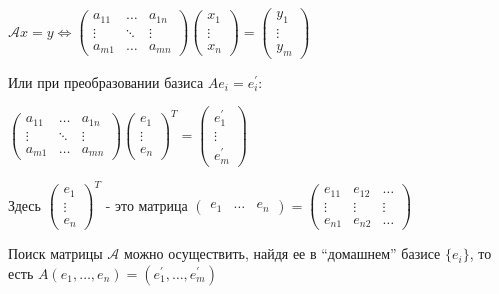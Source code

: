 \documentclass[12pt]{article}
\begin{document}
    $\mathcal{A}x = y \Longleftrightarrow \begin{pmatrix}
         a_{11} & \dots & a_{1n} \\
         \vdots & \ddots & \vdots \\
         a_{m1} & \dots & a_{mn}
    \end{pmatrix} \begin{pmatrix}
         x_1 \\
         \vdots \\
         x_n
    \end{pmatrix} = \begin{pmatrix}
         y_1 \\
         \vdots \\
         y_m
    \end{pmatrix}$

    Или при преобразовании базиса $Ae_i = e^\prime_i$:

    $\begin{pmatrix}
         a_{11} & \dots & a_{1n} \\
         \vdots & \ddots & \vdots \\
         a_{m1} & \dots & a_{mn}
    \end{pmatrix} \begin{pmatrix}
         e_1 \\
         \vdots \\
         e_n
    \end{pmatrix}^T = \begin{pmatrix}
         e_1^\prime \\
         \vdots \\
         e_m^\prime
    \end{pmatrix}$

    Здесь $\begin{pmatrix}
         e_1 \\
         \vdots \\
         e_n
    \end{pmatrix}^T$ - это матрица $\begin{pmatrix}
         e_1 & \dots & e_n
    \end{pmatrix} = \begin{pmatrix}
         e_{11} & e_{12} & \dots \\
         \vdots & \vdots & \vdots \\
         e_{n1} & e_{n2} & \dots
    \end{pmatrix}$

    \Nota Поиск матрицы $\mathcal{A}$ можно осуществить, найдя ее в \enquote{домашнем} базисе $\{e_i\}$, то есть $A (e_1, \dots, e_n) = (e_1^\prime, \dots, e_m^\prime)$
\end{document}
